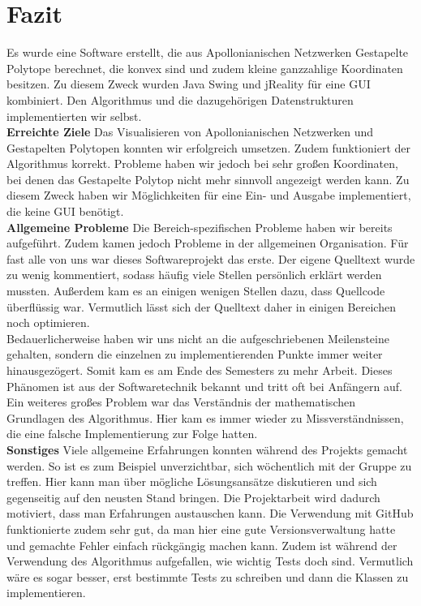 \section*{Fazit}
Es wurde eine Software erstellt, die aus Apollonianischen Netzwerken Gestapelte Polytope berechnet, die konvex sind und zudem kleine ganzzahlige Koordinaten besitzen. Zu diesem Zweck wurden Java Swing und jReality für eine GUI kombiniert. Den Algorithmus und die dazugehörigen Datenstrukturen implementierten wir selbst.\\

\textbf{Erreichte Ziele} Das Visualisieren von Apollonianischen Netzwerken und Gestapelten Polytopen konnten wir erfolgreich umsetzen. Zudem funktioniert der Algorithmus korrekt. Probleme haben wir jedoch bei sehr großen Koordinaten, bei denen das Gestapelte Polytop nicht mehr sinnvoll angezeigt werden kann. Zu diesem Zweck haben wir Möglichkeiten für eine Ein- und Ausgabe implementiert, die keine GUI benötigt.\\

\textbf{Allgemeine Probleme} Die Bereich-spezifischen Probleme haben wir bereits aufgeführt. Zudem kamen jedoch Probleme in der allgemeinen Organisation. Für fast alle von uns war dieses Softwareprojekt das erste. Der eigene Quelltext wurde zu wenig kommentiert, sodass häufig viele Stellen persönlich erklärt werden mussten. Außerdem kam es an einigen wenigen Stellen dazu, dass Quellcode überflüssig war. Vermutlich lässt sich der Quelltext daher in einigen Bereichen noch optimieren.\\ Bedauerlicherweise haben wir uns nicht an die aufgeschriebenen Meilensteine gehalten, sondern die einzelnen zu implementierenden Punkte immer weiter hinausgezögert. Somit kam es am Ende des Semesters zu mehr Arbeit. Dieses Phänomen ist aus der Softwaretechnik bekannt und tritt oft bei Anfängern auf.\\
Ein weiteres großes Problem war das Verständnis der mathematischen Grundlagen des Algorithmus. Hier kam es immer wieder zu Missverständnissen, die eine falsche Implementierung zur Folge hatten.\\

\textbf{Sonstiges} Viele allgemeine Erfahrungen konnten während des Projekts gemacht werden. So ist es zum Beispiel unverzichtbar, sich wöchentlich mit der Gruppe zu treffen. Hier kann man über mögliche Lösungsansätze diskutieren und sich gegenseitig auf den neusten Stand bringen. Die Projektarbeit wird dadurch motiviert, dass man Erfahrungen austauschen kann. Die Verwendung mit GitHub funktionierte zudem sehr gut, da man hier eine gute Versionsverwaltung hatte und gemachte Fehler einfach rückgängig machen kann. Zudem ist während der Verwendung des Algorithmus aufgefallen, wie wichtig Tests doch sind. Vermutlich wäre es sogar besser, erst bestimmte Tests zu schreiben und dann die Klassen zu implementieren.\\


